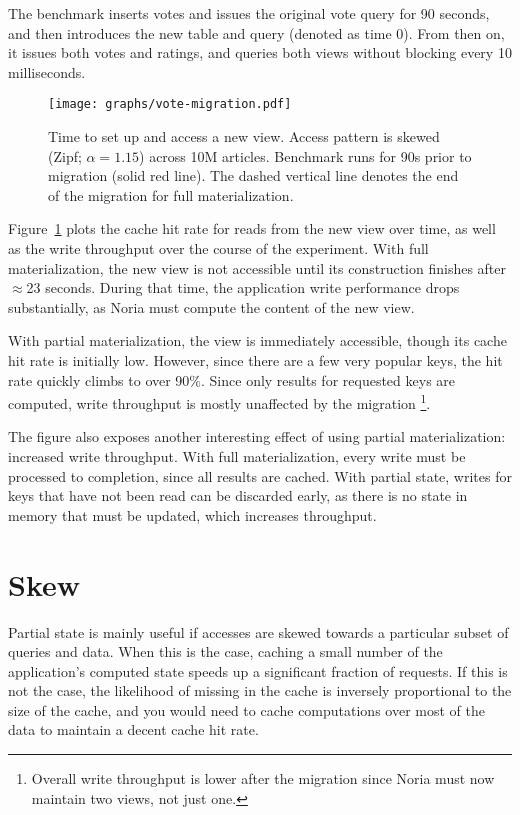 The benchmark inserts votes and issues the original vote query for 90 seconds,
and then introduces the new table and query (denoted as time 0). From then on,
it issues both votes and ratings, and queries both views without blocking every
10 milliseconds.

\begin{figure}[h]
  \centering
  \texttt{[image: graphs/vote-migration.pdf]}
  \caption{Time to set up and access a new view. Access pattern is skewed (Zipf;
  $\alpha = 1.15$) across 10M articles. Benchmark runs for 90s prior to
  migration (solid red line). The dashed vertical line denotes the end of the
  migration for full materialization.}
  \label{f:vote-migration}
\end{figure}

Figure~\ref{f:vote-migration} plots the cache hit rate for reads from the new
view over time, as well as the write throughput over the course of the
experiment. With full materialization, the new view is not accessible until its
construction finishes after $\approx$23 seconds. During that time, the
application write performance drops substantially, as Noria must compute the
content of the new view.

With partial materialization, the view is immediately accessible, though its
cache hit rate is initially low. However, since there are a few very popular
keys, the hit rate quickly climbs to over 90\%. Since only results for requested
keys are computed, write throughput is mostly unaffected by the migration%
\footnote{Overall write throughput is lower after the migration since Noria must
now maintain two views, not just one.}.

The figure also exposes another interesting effect of using partial
materialization: increased write throughput. With full materialization, every
write must be processed to completion, since all results are cached. With
partial state, writes for keys that have not been read can be discarded early,
as there is no state in memory that must be updated, which increases throughput.

\section{Skew}
\label{s:eval:patterns}

Partial state is mainly useful if accesses are skewed towards a particular
subset of queries and data. When this is the case, caching a small number of the
application's computed state speeds up a significant fraction of requests. If
this is not the case, the likelihood of missing in the cache is inversely
proportional to the size of the cache, and you would need to cache computations
over most of the data to maintain a decent cache hit rate.

